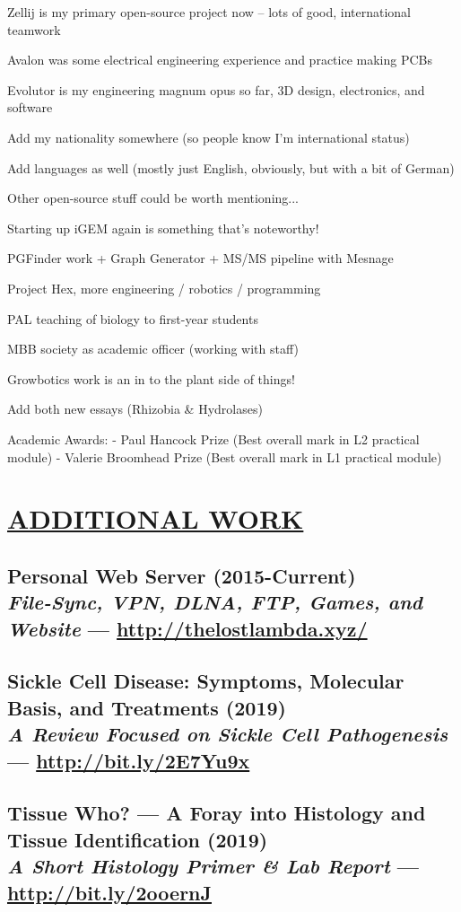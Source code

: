 \documentclass[twocolumn, a4paper, fontsize=9pt, headsepline, footsepline]{scrartcl}
\begin{document}
Zellij is my primary open-source project now – lots of good, international
teamwork

Avalon was some electrical engineering experience and practice making PCBs

Evolutor is my engineering magnum opus so far, 3D design, electronics, and software

Add my nationality somewhere (so people know I'm international status)

Add languages as well (mostly just English, obviously, but with a bit of German)

Other open-source stuff could be worth mentioning...

Starting up iGEM again is something that's noteworthy!

PGFinder work + Graph Generator + MS/MS pipeline with Mesnage

Project Hex, more engineering / robotics / programming

PAL teaching of biology to first-year students

MBB society as academic officer (working with staff)

Growbotics work is an in to the plant side of things!

Add both new essays (Rhizobia & Hydrolases)

Academic Awards:
  - Paul Hancock Prize (Best overall mark in L2 practical module)
  - Valerie Broomhead Prize (Best overall mark in L1 practical module)


\onecolumn
{}
\section*{\ul{ADDITIONAL WORK}}
\subsection*{Personal Web Server (2015-Current)\\\textmd{\emph{File-Sync, VPN,
    DLNA, FTP, Games, and Website} — \url{http://thelostlambda.xyz/}}}
\subsection*{Sickle Cell Disease: Symptoms, Molecular Basis, and Treatments
(2019)\\\textmd{\emph{A Review Focused on Sickle Cell Pathogenesis} — \url{http://bit.ly/2E7Yu9x}}}
\subsection*{Tissue Who? — A Foray into Histology and Tissue Identification
  (2019)\\\textmd{\emph{A Short Histology Primer \& Lab Report} —
    \url{http://bit.ly/2ooernJ}}}
\end{document}
